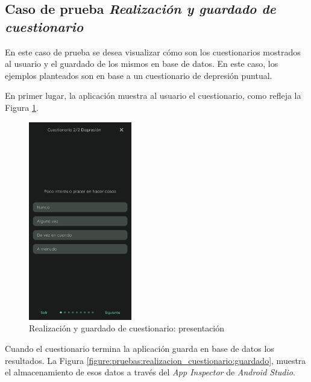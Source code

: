         \subsection*{Caso de prueba \textit{Realización y guardado de cuestionario}} 
            En este caso de prueba se desea visualizar cómo son los cuestionarios mostrados al usuario y el guardado de los mismos en base de datos. En este caso, los ejemplos planteados son en base a un cuestionario de depresión puntual.

            En primer lugar, la aplicación muestra al usuario el cuestionario, como refleja la Figura \ref{figure:pruebas:realizacion_cuestionario:presentacion}.

            \begin{figure}[h]
                \centering
                \includegraphics[width=0.4\textwidth]{figures/pruebas/realizacion_cuestionario/Presentacion.png}
                \caption{Realización y guardado de cuestionario: presentación}
                \label{figure:pruebas:realizacion_cuestionario:presentacion}
            \end{figure}

            Cuando el cuestionario termina la aplicación guarda en base de datos los resultados. La Figura \ref{figure:pruebas:realizacion_cuestionario:guardado}, muestra el almacenamiento de esos datos a través del \textit{App Inspector} de \textit{Android Studio}.

